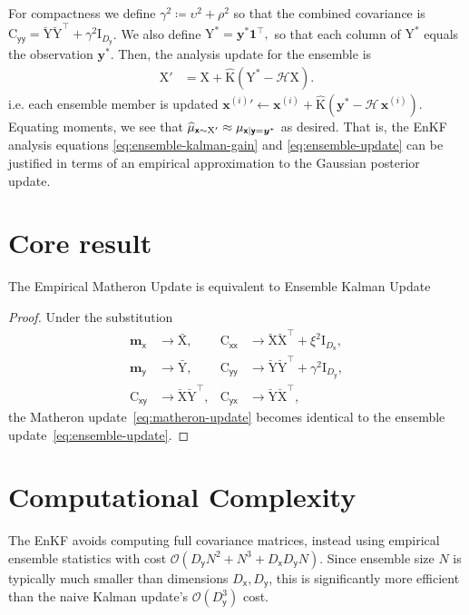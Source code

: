 \documentclass[runningheads]{llncs}
\newcommand{\vv}[1]{\boldsymbol{#1}}
\newcommand{\mm}[1]{\mathrm{#1}}
\newcommand{\mmmean}[1]{\bar{\mathrm{#1}}}
\newcommand{\mmdev}[1]{\breve{\mathrm{#1}}}
\newcommand{\rv}[1]{\mathsf{#1}}
\newcommand{\vrv}[1]{\vv{\rv{#1}}}
\newcommand{\op}[1]{\mathcal{#1}}
\newcommand{\gvn}{\mid}
\begin{document}
For compactness we define \(\gamma^2 \coloneq \upsilon^2 + \rho^2\) so that the combined covariance is \(\mm{C}_{\vrv{yy}} = \mmdev{Y} \mmdev{Y}^\top + \gamma^2\mm{I}_{D_{\vrv{y}}}\).
We also define
$\mm{Y}^* = \vv{y}^* \mathbf{1}^\top,$
so that each column of \(\mm{Y}^*\) equals the observation \(\vv{y}^*\). Then, the analysis update for the ensemble is
\begin{align}
    \mm{X}' &= \mm{X} + \widehat{\mm{K}} \left(\mm{Y}^* - \op{H}\mm{X}\right).\label{eq:ensemble-update}
\end{align}
i.e. each ensemble member is updated
\(\vv{x}^{(i)}{}' \gets \vv{x}^{(i)} + \widehat{\mm{K}} \left(\vv{y}^* - \op{H}\,\vv{x}^{(i)}\right).\)
Equating moments, we see that
\(\ELaw[\vrv{x}\sim \mm{X}']
\approx \Law[\vrv{x} \gvn \vrv{y}=\vv{y}^*] \) as desired.
That is, the EnKF analysis equations \eqref{eq:ensemble-kalman-gain} and \eqref{eq:ensemble-update} can be justified in terms of an empirical approximation to the Gaussian posterior update.

\section{Core result}
\begin{proposition}
    The Empirical Matheron Update is equivalent to Ensemble Kalman Update
\end{proposition}
\begin{proof}
Under the substitution
\begin{align}
    \vv{m}_{\vrv{x}} &\to \mmmean{X}, & \mm{C}_{\vrv{xx}} &\to \mmdev{X} \mmdev{X}^\top + \xi^2\mm{I}_{D_{\vrv{x}}},\\
    \vv{m}_{\vrv{y}} &\to \mmmean{Y}, & \mm{C}_{\vrv{yy}} &\to \mmdev{Y} \mmdev{Y}^\top + \gamma^2\mm{I}_{D_{\vrv{y}}},\\
    \mm{C}_{\vrv{xy}} &\to \mmdev{X} \mmdev{Y}^\top, & \mm{C}_{\vrv{yx}} &\to \mmdev{Y} \mmdev{X}^\top,
\end{align}
the Matheron update~\eqref{eq:matheron-update} becomes identical to the ensemble update~\eqref{eq:ensemble-update}.
\end{proof}

\section{Computational Complexity}
The EnKF avoids computing full covariance matrices, instead using empirical ensemble statistics with cost $\mathcal{O}(D_{\vrv{y}}N^2 + N^3 + D_{\vrv{x}}D_{\vrv{y}}N)$. Since ensemble size $N$ is typically much smaller than dimensions $D_{\vrv{x}}, D_{\vrv{y}}$, this is significantly more efficient than the naive Kalman update's $\mathcal{O}(D_{\vrv{y}}^3)$ cost.
\end{document}
